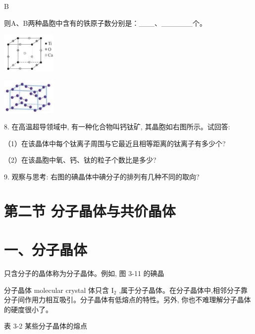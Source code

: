\documentclass[10pt]{article}
\begin{document}
B

则A、B两种晶胞中含有的铁原子数分别是：\_\_\_、\_\_\_\_\_\_个。

\begin{center}
\includegraphics[max width=0.2\textwidth]{images/0190e026-5a11-7df7-bd27-54d09026ba7a_80_325789.jpg}
\end{center}

\begin{center}
\includegraphics[max width=0.2\textwidth]{images/0190e026-5a11-7df7-bd27-54d09026ba7a_80_627746.jpg}
\end{center}

8. 在高温超导领域中, 有一种化合物叫钙钛矿, 其晶胞如右图所示。试回答:

（1）在该晶体中每个钛离子周围与它最近且相等距离的钛离子有多少个?

（2）在该晶胞中氧、钙、钛的粒子个数比是多少?

9. 观察与思考: 右图的碘晶体中碘分子的排列有几种不同的取向?

\section*{第二节 分子晶体与共价晶体}

\section*{一、分子晶体}

只含分子的晶体称为分子晶体。例如, 图 3-11 的碘晶

分子晶体 molecular crystal 体只含 \({\mathrm{I}}_{2}\) ,属于分子晶体。在分子晶体中,相邻分子靠分子间作用力相互吸引。分子晶体有低熔点的特性。另外, 你也不难理解分子晶体的硬度很小了。

表 3-2 某些分子晶体的熔点

\begin{center}
\end{center}
\end{document}
